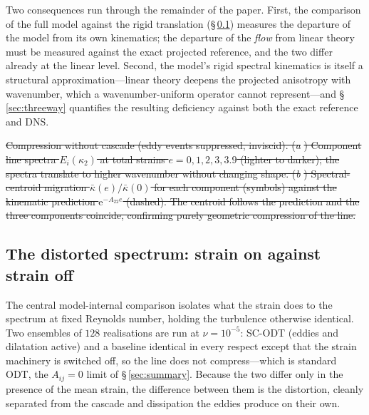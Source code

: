 \documentclass[lineno]{JFM-FLM_Au}
\providecommand{\DIFdel}[1]{{\protect\color{red}\sout{#1}}} %
\providecommand{\DIFdelbegin}{} %
\providecommand{\DIFdelend}{} %
\providecommand{\DIFdelFL}[1]{\DIFdel{#1}} %
\begin{document}
Two consequences run through the remainder of the paper. First, the
comparison of the full model against the rigid translation
(\S\,\ref{sec:spec-bvc}) measures the departure of the model from its own
kinematics; the departure of the \emph{flow} from linear theory must be
measured against the exact projected reference, and the two differ already
at the linear level. Second, the model's rigid spectral kinematics is
itself a structural approximation---linear theory deepens the projected
anisotropy with wavenumber, which a wavenumber-uniform operator cannot
represent---and \S\,\ref{sec:threeway} quantifies the resulting deficiency
against both the exact reference and DNS.



\DIFdelbegin %
{%
\DIFdelFL{Compression without cascade (eddy events suppressed, inviscid).
  (}\textit{\DIFdelFL{a}}%
\DIFdelFL{) Component line spectra $E_i(\kappa_2)$ at total strains
  $e=0,1,2,3,3.9$ (lighter to darker); the spectra translate to higher
  wavenumber without changing shape.
  (}\textit{\DIFdelFL{b}}%
\DIFdelFL{) Spectral-centroid migration $\bar\kappa(e)/\bar\kappa(0)$
  for each component (symbols) against the kinematic prediction
  $\mathrm{e}^{-A_{22}e}$ (dashed). The centroid follows the prediction
  and the three components coincide, confirming purely geometric
  compression of the line.}}

\DIFdelend %

\subsection{The distorted spectrum: strain on against strain
off}\label{sec:spec-bvc}

The central model-internal comparison isolates what the strain does to
the spectrum at fixed Reynolds number, holding the turbulence otherwise
identical. Two ensembles of $128$ realisations are run at $\nu=10^{-5}$:
SC-ODT (eddies and dilatation active) and a baseline identical
in every respect except that the strain machinery is switched off, so
the line does not compress---which is standard ODT, the $A_{ij}=0$
limit of \S\,\ref{sec:summary}. Because the two differ only in the presence
of the mean strain, the difference between them is the distortion,
cleanly separated from the cascade and dissipation the eddies produce on
their own.
\end{document}
